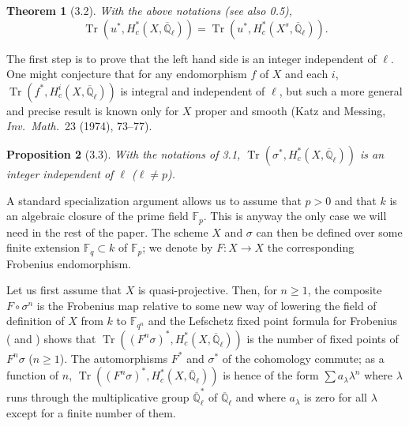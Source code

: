 \documentclass[11pt]{amsart}
\theoremstyle{plain}
\newtheorem{theorem}{Theorem}[section]
\newtheorem{proposition}[theorem]{Proposition}
\theoremstyle{remark}
\DeclareMathOperator{\Tr}{Tr}
\begin{document}
\begin{theorem}[3.2]
With the above notations (see also 0.5),
\[
\Tr(u^*, H_c^*(X, \overline{\mathbb{Q}}_\ell)) = \Tr(u^*, H_c^*(X^s, \overline{\mathbb{Q}}_\ell)).
\]
\end{theorem}

The first step is to prove that the left hand side is an integer independent of $\ell$. One might conjecture that for any endomorphism $f$ of $X$ and each $i$, $\Tr(f^*, H_c^i(X, \overline{\mathbb{Q}}_\ell))$ is integral and independent of $\ell$, but such a more general and precise result is known only for $X$ proper and smooth (Katz and Messing, \textit{Inv.\ Math.}\ 23 (1974), 73--77).

\begin{proposition}[3.3]
With the notations of 3.1, $\Tr(\sigma^*, H_c^*(X, \overline{\mathbb{Q}}_\ell))$ is an integer independent of $\ell$ ($\ell \neq p$).
\end{proposition}

A standard specialization argument allows us to assume that $p > 0$ and that $k$ is an algebraic closure of the prime field $\mathbb{F}_p$. This is anyway the only case we will need in the rest of the paper. The scheme $X$ and $\sigma$ can then be defined over some finite extension $\mathbb{F}_q \subset k$ of $\mathbb{F}_p$; we denote by $F: X \to X$ the corresponding Frobenius endomorphism.

Let us first assume that $X$ is quasi-projective. Then, for $n \ge 1$, the composite $F \circ \sigma^n$ is the Frobenius map relative to some new way of lowering the field of definition of $X$ from $k$ to $\mathbb{F}_{q^n}$ and the Lefschetz fixed point formula for Frobenius (\cite{SGA4.5} and \cite{Gro}) shows that $\Tr((F^n\sigma)^*, H_c^*(X, \overline{\mathbb{Q}}_\ell))$ is the number of fixed points of $F^n\sigma$ ($n \ge 1$). The automorphisms $F^*$ and $\sigma^*$ of the cohomology commute; as a function of $n$, $\Tr((F^n\sigma)^*, H_c^*(X, \overline{\mathbb{Q}}_\ell))$ is hence of the form $\sum a_\lambda \lambda^n$ where $\lambda$ runs through the multiplicative group $\overline{\mathbb{Q}}_\ell^*$ of $\overline{\mathbb{Q}}_\ell$ and where $a_\lambda$ is zero for all $\lambda$ except for a finite number of them.
\end{document}
